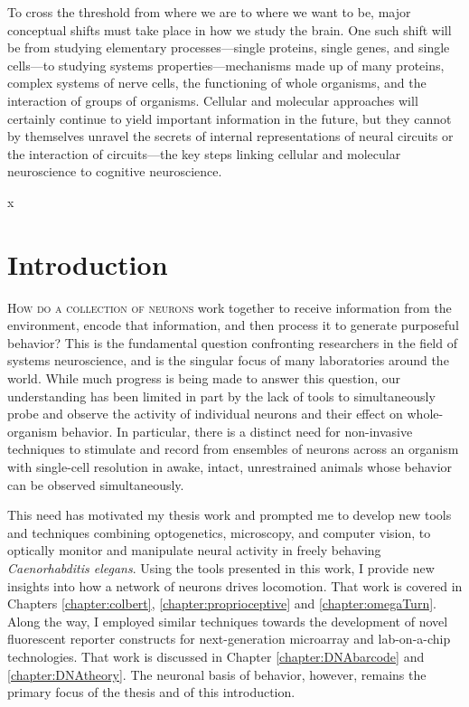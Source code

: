 \begin{savequote}[75mm] 
To cross the threshold from where we are to where we want to be, major conceptual shifts must take place in how we study the brain. One such shift will be from studying elementary processes---single proteins, single genes, and single cells---to studying systems properties---mechanisms made up of many proteins, complex systems of nerve cells, the functioning of whole organisms, and the interaction of groups of organisms. Cellular and molecular approaches will certainly continue to yield important information in the future, but they cannot by themselves unravel the secrets of internal representations of neural circuits or the interaction of circuits---the key steps linking cellular and molecular neuroscience to cognitive neuroscience. 
\end{savequote}
x


\chapter{Introduction}

\lettrine{H}{ow do a collection of neurons} work together to receive information from the environment, encode that information, and then process it to generate  purposeful behavior?  This is the fundamental question  confronting researchers in the field of systems neuroscience, and is the singular focus of many laboratories around the world. While much progress is being made to answer this question, our understanding has been limited in part by the lack of tools to simultaneously probe and observe the activity of individual neurons and their effect on whole-organism behavior. In particular, there is a distinct need for non-invasive techniques to stimulate and record from ensembles of neurons across an organism with single-cell resolution in awake, intact, unrestrained animals whose behavior can be observed simultaneously.

This need has motivated my thesis work and prompted me to develop new tools and techniques combining optogenetics, microscopy, and computer vision, to optically monitor and manipulate neural activity in freely behaving \emph{Caenorhabditis elegans}. Using the tools presented in this work, I provide new insights into how a network of neurons drives locomotion. That work is covered in Chapters \ref{chapter:colbert}, \ref{chapter:proprioceptive} and  \ref{chapter:omegaTurn}. Along the way, I employed similar techniques  towards the development of  novel fluorescent reporter constructs for next-generation microarray and lab-on-a-chip technologies. That work is discussed in Chapter \ref{chapter:DNAbarcode} and \ref{chapter:DNAtheory}. The neuronal basis of behavior, however, remains the primary focus of the thesis and of this introduction.


